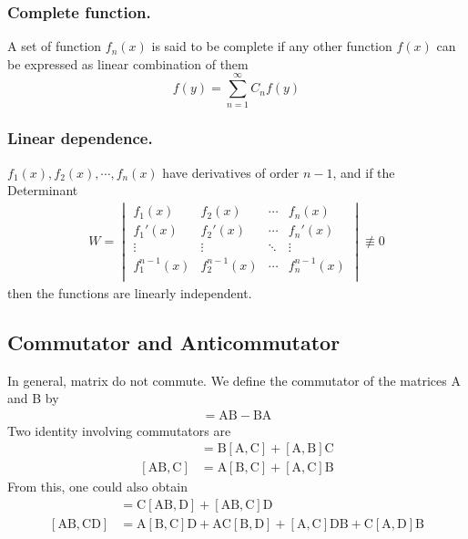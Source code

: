 \documentclass[../../../main.tex]{subfiles}
\begin{document}
\subsubsection{Complete function.}
A set of function $f_n(x)$ is said to be complete if any other function $f(x)$ can be expressed as linear combination of them
\begin{equation*}
	f(y)=\sum_{n=1}^{\infty} C_nf(y)
\end{equation*}

\subsubsection{Linear dependence.}
$f_1(x), f_2(x),\cdots, f_n(x)$ have derivatives of order $n - 1$, and if the Determinant
\begin{align*}
	W=\begin{vmatrix}
		  f_1(x)       & f_2(x)       & \cdots & f_n(x)       \\
		  f_1'(x)      & f_2'(x)      & \cdots & f_n'(x)      \\
		  \vdots       & \vdots       & \ddots & \vdots       \\
		  f_1^{n-1}(x) & f_2^{n-1}(x) & \cdots & f_n^{n-1}(x) \\
	  \end{vmatrix}\not\equiv0
\end{align*}then the functions are linearly independent.

\subsection{Commutator and Anticommutator}
In general, matrix do not commute. We define the commutator of the matrices A and B by
\begin{align*}
	[\mathrm{A}, \mathrm{B}] = \mathrm{A}\mathrm{B} -\mathrm{B}\mathrm{A}
\end{align*}
Two identity involving commutators are
\begin{align*}
	[\mathrm{A},\mathrm{B}\mathrm{C}] & =\mathrm{B}[\mathrm{A},\mathrm{C}]+[\mathrm{A},\mathrm{B}]\mathrm{C} \\
	[\mathrm{A}\mathrm{B},\mathrm{C}] & =\mathrm{A}[\mathrm{B},\mathrm{C}]+[\mathrm{A},\mathrm{C}]\mathrm{B}
\end{align*}
From this, one could also obtain
\begin{align*}
	[\mathrm{A}\mathrm{B},\mathrm{C}\mathrm{D}]
	 & =  \mathrm{C}[\mathrm{A}\mathrm{B},\mathrm{D}]+[\mathrm{A}\mathrm{B},\mathrm{C}]\mathrm{D} \\
	[\mathrm{A}\mathrm{B},\mathrm{C}\mathrm{D}]
	 & = \mathrm{A}[\mathrm{B},\mathrm{C}]\mathrm{D}
	+ \mathrm{A}\mathrm{C}[\mathrm{B},\mathrm{D}]
	+ [\mathrm{A},\mathrm{C}]\mathrm{D}\mathrm{B}
	+ \mathrm{C}[\mathrm{A},\mathrm{D}]\mathrm{B}
\end{align*}
\end{document}
